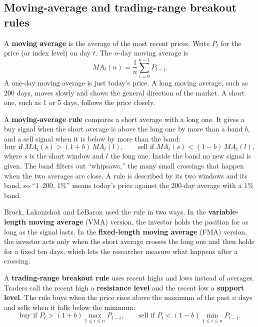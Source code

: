 \subsection{Moving-average and trading-range breakout rules}

A \textbf{moving average} is the average of the most recent prices. Write $P_t$ for the price (or index level) on day $t$. The $n$-day moving average is
\begin{equation}
  MA_t(n) = \frac{1}{n} \sum_{i=0}^{n-1} P_{t-i}.
  \label{eq:08-ma}
\end{equation}
A one-day moving average is just today's price. A long moving average, such as 200 days, moves slowly and shows the general direction of the market. A short one, such as 1 or 5 days, follows the price closely.

A \textbf{moving-average rule} compares a short average with a long one. It gives a buy signal when the short average is above the long one by more than a band $b$, and a sell signal when it is below by more than the band:
\begin{equation}
  \text{buy if } MA_t(s) > (1+b)\,MA_t(l), \qquad \text{sell if } MA_t(s) < (1-b)\,MA_t(l),
  \label{eq:08-marule}
\end{equation}
where $s$ is the short window and $l$ the long one. Inside the band no new signal is given. The band filters out ``whipsaws,'' the many small crossings that happen when the two averages are close. A rule is described by its two windows and its band, so ``1--200, 1\%'' means today's price against the 200-day average with a 1\% band.

Brock, Lakonishok and LeBaron used the rule in two ways. In the \textbf{variable-length moving average} (VMA) version, the investor holds the position for as long as the signal lasts. In the \textbf{fixed-length moving average} (FMA) version, the investor acts only when the short average crosses the long one and then holds for a fixed ten days, which lets the researcher measure what happens after a crossing.

A \textbf{trading-range breakout rule} uses recent highs and lows instead of averages. Traders call the recent high a \textbf{resistance level} and the recent low a \textbf{support level}. The rule buys when the price rises above the maximum of the past $n$ days and sells when it falls below the minimum:
\begin{equation}
  \text{buy if } P_t > (1+b)\max_{1\le i\le n} P_{t-i}, \qquad \text{sell if } P_t < (1-b)\min_{1\le i\le n} P_{t-i}.
  \label{eq:08-trb}
\end{equation}

